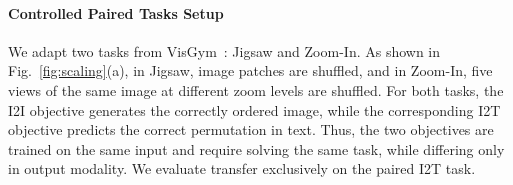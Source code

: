 \paragraph{Controlled Paired Tasks Setup}
We adapt two tasks from VisGym~\citep{wang2026visgym}: Jigsaw and Zoom-In.
As shown in Fig.~\ref{fig:scaling}(a), 
in Jigsaw, image patches are shuffled, and in Zoom-In, five views of the same image at different zoom levels are shuffled.
For both tasks, the I2I objective generates the correctly ordered image, while the corresponding I2T objective predicts the correct permutation in text.
Thus, the two objectives are trained on the same input and require solving the same task, while differing only in output modality.
We evaluate transfer exclusively on the paired I2T task.
